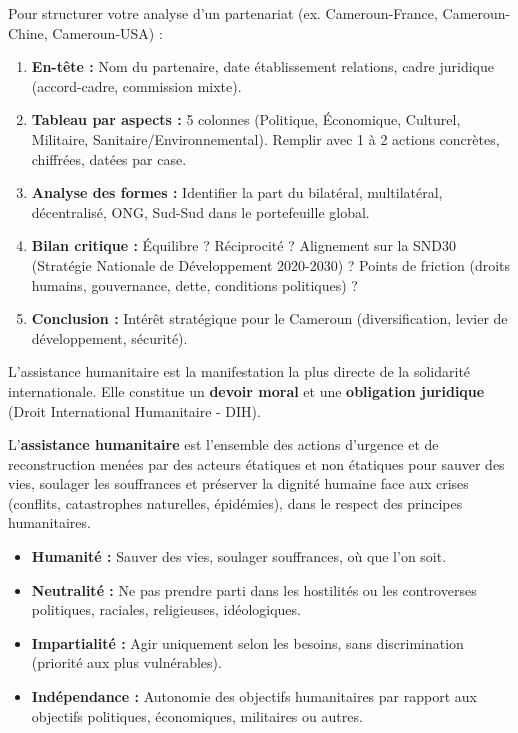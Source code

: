 \documentclass[11pt]{article}
\newcounter{popsec}
\newcounter{popsub}
\newcommand{\courssub}[1]{%
  \stepcounter{popsub}%
  \par\vspace{9pt}\noindent{\popxbold\fontsize{11.5}{13}\selectfont\color{popink}{\color{poporange}\thepopsec.\thepopsub}\hspace{6pt}#1}\par\nopagebreak\vspace{4pt}
}
\begin{document}
\begin{methode}
Pour structurer votre analyse d'un partenariat (ex. Cameroun-France, Cameroun-Chine, Cameroun-USA) :
\begin{enumerate}
    \item \textbf{En-tête :} Nom du partenaire, date établissement relations, cadre juridique (accord-cadre, commission mixte).
    \item \textbf{Tableau par aspects :} 5 colonnes (Politique, Économique, Culturel, Militaire, Sanitaire/Environnemental). Remplir avec 1 à 2 actions concrètes, chiffrées, datées par case.
    \item \textbf{Analyse des formes :} Identifier la part du bilatéral, multilatéral, décentralisé, ONG, Sud-Sud dans le portefeuille global.
    \item \textbf{Bilan critique :} Équilibre ? Réciprocité ? Alignement sur la SND30 (Stratégie Nationale de Développement 2020-2030) ? Points de friction (droits humains, gouvernance, dette, conditions politiques) ?
    \item \textbf{Conclusion :} Intérêt stratégique pour le Cameroun (diversification, levier de développement, sécurité).
\end{enumerate}
\end{methode}

\courssub{Dossier 1 : L'assistance humanitaire}

L'assistance humanitaire est la manifestation la plus directe de la solidarité internationale. Elle constitue un \textbf{devoir moral} et une \textbf{obligation juridique} (Droit International Humanitaire - DIH).

\begin{definition}
L'\textbf{assistance humanitaire} est l'ensemble des actions d'urgence et de reconstruction menées par des acteurs étatiques et non étatiques pour sauver des vies, soulager les souffrances et préserver la dignité humaine face aux crises (conflits, catastrophes naturelles, épidémies), dans le respect des principes humanitaires.
\end{definition}

\begin{propriete}
\begin{itemize}
    \item \textbf{Humanité :} Sauver des vies, soulager souffrances, où que l'on soit.
    \item \textbf{Neutralité :} Ne pas prendre parti dans les hostilités ou les controverses politiques, raciales, religieuses, idéologiques.
    \item \textbf{Impartialité :} Agir uniquement selon les besoins, sans discrimination (priorité aux plus vulnérables).
    \item \textbf{Indépendance :} Autonomie des objectifs humanitaires par rapport aux objectifs politiques, économiques, militaires ou autres.
\end{itemize}
\end{propriete}
\end{document}
